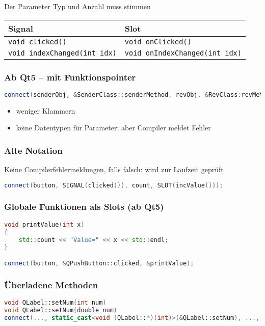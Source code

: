 Der Parameter Typ und Anzahl muss stimmen
\begin{center}
    \begin{tabular}{l l}
        Signal                                 & Slot \\
        \midrule
        \texttt{void clicked()}             & \texttt{void onClicked()} \\
        \texttt{void indexChanged(int idx)} & \texttt{void onIndexChanged(int idx)}
    \end{tabular}
\end{center}


\subsubsection*{Ab Qt5 -- mit Funktionspointer}
\begin{lstlisting}[language=c++]
connect(senderObj, &SenderClass::senderMethod, revObj, &RevClass:revMethod);
\end{lstlisting}
\begin{itemize}
    \item weniger Klammern 
    \item keine Datentypen für Parameter; aber Compiler meldet Fehler
\end{itemize}

\subsubsection*{Alte Notation}
Keine Compilerfehlermeldungen, falls falsch: wird zur Laufzeit geprüft
\begin{lstlisting}[language=c++]
connect(button, SIGNAL(clicked()), count, SLOT(incValue()));
\end{lstlisting}

\subsubsection*{Globale Funktionen als Slots (ab Qt5)} 
\begin{lstlisting}[language=c++]
void printValue(int x)
{
    std::count << "Value=" << x << std::endl;
} 

connect(button, &QPushButton::clicked, &printValue); 
\end{lstlisting}


\subsubsection*{Überladene Methoden} 
\begin{lstlisting}[language=c++]
void QLabel::setNum(int num)
void QLabel::setNum(double num)
connect(..., static_cast<void (QLabel::*)(int)>(&QLabel::setNum), ..., ...);
\end{lstlisting}

